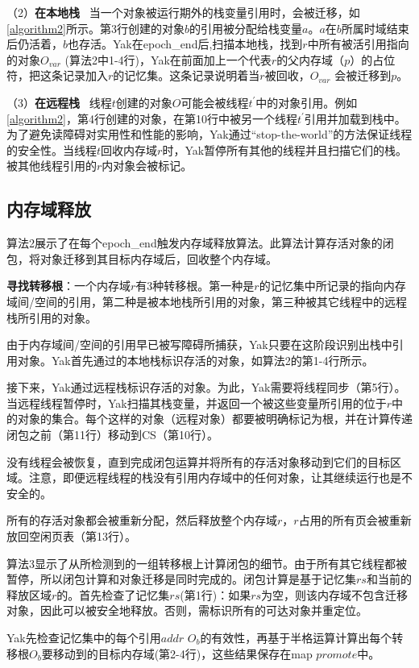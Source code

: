 （2）\textbf{在本地栈} \ 当一个对象被运行期外的栈变量引用时，会被迁移，如\ref{algorithm2}所示。第3行创建的对象$b$的引用被分配给栈变量$a$。$a$在$b$所属时域结束后仍活着，$b$也存活。Yak在epoch\_end后,扫描本地栈，找到$r$中所有被活引用指向的对象$O_{var}$ (算法2中1-4行)，Yak在前面加上一个代表$r$的父内存域（$p$）的占位符，把这条记录加入$r$的记忆集。这条记录说明着当$r$被回收，$O_{var}$ 会被迁移到$p$。

（3）\textbf{在远程栈} \ 线程$t$创建的对象$O$可能会被线程$t^{'}$中的对象引用。例如\ref{algorithm2}，第4行创建的对象，在第10行中被另一个线程$t^{'}$引用并加载到栈中。为了避免读障碍对实用性和性能的影响，Yak通过“stop-the-world”的方法保证线程的安全性。当线程$t$回收内存域$r$时，Yak暂停所有其他的线程并且扫描它们的栈。被其他线程引用的$r$内对象会被标记。

\subsection{内存域释放}
算法2展示了在每个epoch\_end触发内存域释放算法。此算法计算存活对象的闭包，将对象迁移到其目标内存域后，回收整个内存域。

\textbf{寻找转移根}：一个内存域$r$有3种转移根。第一种是$r$的记忆集中所记录的指向内存域间/空间的引用，第二种是被本地栈所引用的对象，第三种被其它线程中的远程栈所引用的对象。

由于内存域间/空间的引用早已被写障碍所捕获，Yak只要在这阶段识别出栈中引用对象。Yak首先通过的本地栈标识存活的对象，如算法2的第1-4行所示。

接下来，Yak通过远程栈标识存活的对象。为此，Yak需要将线程同步（第5行）。当远程线程暂停时，Yak扫描其栈变量，并返回一个被这些变量所引用的位于$r$中的对象的集合。每个这样的对象（远程对象）都要被明确标记为根，并在计算传递闭包之前（第11行）移动到CS（第10行）。

没有线程会被恢复，直到完成闭包运算并将所有的存活对象移动到它们的目标区域。注意，即便远程线程的栈没有引用内存域中的任何对象，让其继续运行也是不安全的。

所有的存活对象都会被重新分配，然后释放整个内存域$r$，$r$占用的所有页会被重新放回空闲页表（第13行）。



算法3显示了从所检测到的一组转移根上计算闭包的细节。由于所有其它线程都被暂停，所以闭包计算和对象迁移是同时完成的。闭包计算是基于记忆集$rs$和当前的释放区域$r$的。首先检查了记忆集$rs$(第1行)：如果$rs$为空，则该内存域不包含迁移对象，因此可以被安全地释放。否则，需标识所有的可达对象并重定位。

Yak先检查记忆集中的每个引用${addr}$  $O_{b}$的有效性，再基于半格运算计算出每个转移根$O_{b}$要移动到的目标内存域(第2-4行)，这些结果保存在map $promote$中。

